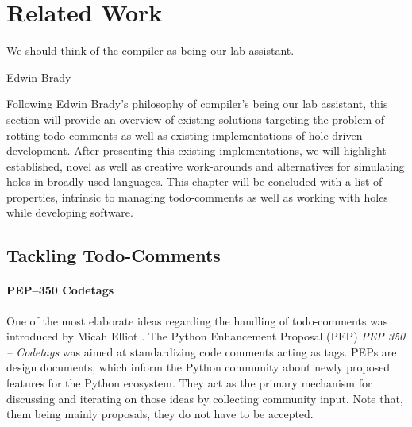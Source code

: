 \chapter[Related Work]{Related Work }
\label{cha:related-work}
\epigraph{We should think of the compiler as being our lab assistant.}{Edwin Brady}

Following Edwin Brady's philosophy of compiler's being our lab assistant, this section will provide an overview of existing solutions targeting the problem of rotting todo-comments as well as existing implementations of hole-driven development.
After presenting this existing implementations, we will highlight established, novel as well as creative work-arounds and alternatives for simulating holes in broadly used languages.
This chapter will be concluded with a list of properties, intrinsic to managing todo-comments as well as working with holes while developing software.

\section[Tackling Todo-Comments]{Tackling Todo-Comments }

\subsubsection{PEP--350 Codetags}
One of the most elaborate ideas regarding the handling of todo-comments was introduced by Micah Elliot \cite{elliott_pep_2005}.
The Python Enhancement Proposal (PEP) \emph{PEP 350 -- Codetags} was aimed at standardizing code comments acting as tags.
PEPs are design documents, which inform the Python community about newly proposed features for the Python ecosystem.
They act as the primary mechanism for discussing and iterating on those ideas by collecting community input.
Note that, them being mainly proposals, they do not have to be accepted.

